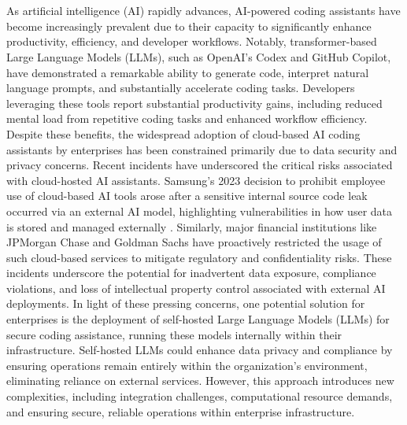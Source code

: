 
\chapter{}%
\label{ch:inleiding}

As artificial intelligence (AI) rapidly advances, AI-powered coding assistants have become increasingly prevalent due to their capacity to significantly enhance productivity, efficiency, and developer workflows. Notably, transformer-based Large Language Models (LLMs), such as OpenAI's Codex and GitHub Copilot, have demonstrated a remarkable ability to generate code, interpret natural language prompts, and substantially accelerate coding tasks. Developers leveraging these tools report substantial productivity gains, including reduced mental load from repetitive coding tasks and enhanced workflow efficiency. Despite these benefits, the widespread adoption of cloud-based AI coding assistants by enterprises has been constrained primarily due to data security and privacy concerns.
Recent incidents have underscored the critical risks associated with cloud-hosted AI assistants. Samsung's 2023 decision to prohibit employee use of cloud-based AI tools arose after a sensitive internal source code leak occurred via an external AI model, highlighting vulnerabilities in how user data is stored and managed externally \autocite{KoreaHerald2023}. Similarly, major financial institutions like JPMorgan Chase and Goldman Sachs have proactively restricted the usage of such cloud-based services to mitigate regulatory and confidentiality risks. These incidents underscore the potential for inadvertent data exposure, compliance violations, and loss of intellectual property control associated with external AI deployments.
In light of these pressing concerns, one potential solution for enterprises is the deployment of self-hosted Large Language Models (LLMs) for secure coding assistance, running these models internally within their infrastructure. Self-hosted LLMs could enhance data privacy and compliance by ensuring operations remain entirely within the organization's environment, eliminating reliance on external services. However, this approach introduces new complexities, including integration challenges, computational resource demands, and ensuring secure, reliable operations within enterprise infrastructure.

